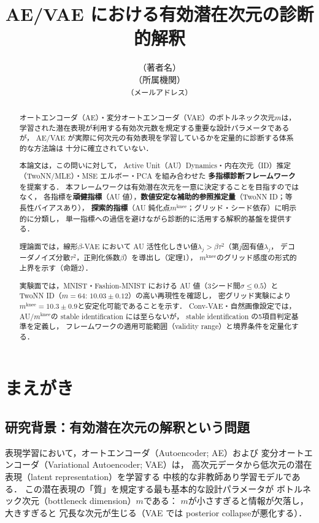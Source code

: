 \documentclass[11pt,a4paper]{jsarticle}
\title{AE/VAE における有効潜在次元の診断的解釈}
\author{（著者名）\\
{\small （所属機関）}\\
{\small \texttt{（メールアドレス）}}}
\date{}
\newcommand{\mknee}{m^{\mathrm{knee}}}
\begin{document}
\maketitle

\begin{abstract}
オートエンコーダ（AE）・変分オートエンコーダ（VAE）のボトルネック次元$m$は，
学習された潜在表現が利用する有効次元数を規定する重要な設計パラメータであるが，
AE/VAE が実際に何次元の有効表現を学習しているかを定量的に診断する体系的な方法論は
十分に確立されていない．

本論文は，この問いに対して，
Active Unit（AU）Dynamics・内在次元（ID）推定（TwoNN/MLE）・MSE エルボー・PCA を組み合わせた
\textbf{多指標診断フレームワーク}を提案する．
本フレームワークは有効潜在次元を一意に決定することを目指すのではなく，
各指標を\textbf{頑健指標}（AU 値），\textbf{数値安定な補助的参照推定量}（TwoNN ID；等長性バイアスあり），
\textbf{探索的指標}（AU 鈍化点$\mknee$；グリッド・シード依存）に明示的に分類し，
単一指標への過信を避けながら診断的に活用する解釈的基盤を提供する．

理論面では，線形$\beta$-VAE において AU 活性化しきい値$\lambda_j > \beta\tau^2$（第$j$固有値$\lambda_j$，
デコーダノイズ分散$\tau^2$，正則化係数$\beta$）を導出し（定理1），
$\mknee$のグリッド感度の形式的上界を示す（命題2）．

実験面では，MNIST・Fashion-MNIST における AU 値（3シード間$\sigma \leq 0.5$）と
TwoNN ID（$m=64$: $10.03 \pm 0.12$）の高い再現性を確認し，
密グリッド実験により$\mknee = 10.3 \pm 0.9$と安定化可能であることを示す．
Conv-VAE・自然画像設定では，AU/$\mknee$の stable identification には至らないが，
stable identification の5項目判定基準を定義し，
フレームワークの適用可能範囲（validity range）と境界条件を定量化する．
\end{abstract}

\section{まえがき}\label{sec:intro}

\subsection{研究背景：有効潜在次元の解釈という問題}\label{sec:intro_bg}

表現学習において，オートエンコーダ（Autoencoder; AE）および
変分オートエンコーダ（Variational Autoencoder; VAE）\cite{kingma2014vae}は，
高次元データから低次元の潜在表現（latent representation）を学習する
中核的な非教師あり学習モデルである\cite{bengio2013representation}．
この潜在表現の「質」を規定する最も基本的な設計パラメータが
ボトルネック次元（bottleneck dimension）$m$である：
$m$が小さすぎると情報が欠落し，大きすぎると
冗長な次元が生じる（VAE では posterior collapse\cite{lucas2019elbo}が悪化する）．
\end{document}
